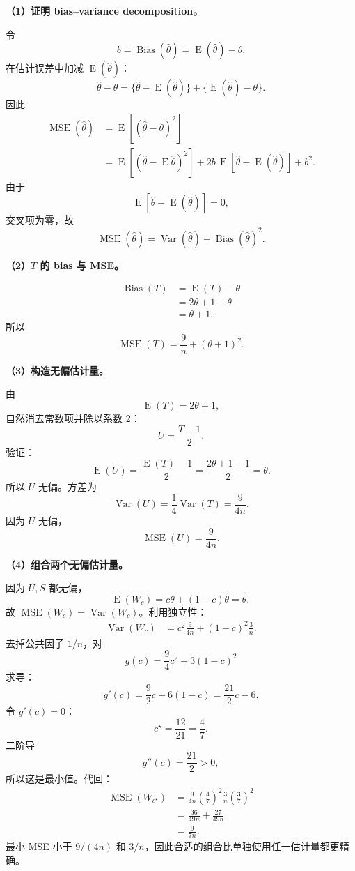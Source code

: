 \documentclass[11pt,a4paper]{article}
\newcommand{\E}{\operatorname{E}}
\newcommand{\Var}{\operatorname{Var}}
\newcommand{\Bias}{\operatorname{Bias}}
\newcommand{\MSE}{\operatorname{MSE}}
\begin{document}
\begin{solutionbox}
\textbf{（1）证明 bias--variance decomposition。}

令
\[
  b=\Bias(\hat\theta)=\E(\hat\theta)-\theta.
\]
在估计误差中加减 $\E(\hat\theta)$：
\[
  \hat\theta-\theta
  =
  \{\hat\theta-\E(\hat\theta)\}
  +
  \{\E(\hat\theta)-\theta\}.
\]
因此
\[
\begin{aligned}
  \MSE(\hat\theta)
  &=
  \E[(\hat\theta-\theta)^2]\\
  &=
  \E[(\hat\theta-\E\hat\theta)^2]
  +2b\,\E[\hat\theta-\E(\hat\theta)]
  +b^2.
\end{aligned}
\]
由于
\[
  \E[\hat\theta-\E(\hat\theta)]=0,
\]
交叉项为零，故
\[
  \boxed{
  \MSE(\hat\theta)
  =
  \Var(\hat\theta)+\Bias(\hat\theta)^2.
  }
\]

\textbf{（2）$T$ 的 bias 与 MSE。}

\[
\begin{aligned}
  \Bias(T)
  &=
  \E(T)-\theta\\
  &=
  2\theta+1-\theta\\
  &=
  \boxed{\theta+1}.
\end{aligned}
\]
所以
\[
  \boxed{
  \MSE(T)
  =
  \frac9n+(\theta+1)^2.
  }
\]

\textbf{（3）构造无偏估计量。}

由
\[
  \E(T)=2\theta+1,
\]
自然消去常数项并除以系数 2：
\[
  \boxed{U=\frac{T-1}{2}}.
\]
验证：
\[
  \E(U)
  =
  \frac{\E(T)-1}{2}
  =
  \frac{2\theta+1-1}{2}
  =
  \theta.
\]
所以 $U$ 无偏。方差为
\[
  \Var(U)
  =
  \frac14\Var(T)
  =
  \boxed{\frac9{4n}}.
\]
因为 $U$ 无偏，
\[
  \boxed{\MSE(U)=\frac9{4n}}.
\]

\textbf{（4）组合两个无偏估计量。}

因为 $U,S$ 都无偏，
\[
  \E(W_c)=c\theta+(1-c)\theta=\theta,
\]
故 $\MSE(W_c)=\Var(W_c)$。利用独立性：
\[
\begin{aligned}
  \Var(W_c)
  &=
  c^2\frac9{4n}
  +(1-c)^2\frac3n.
\end{aligned}
\]
去掉公共因子 $1/n$，对
\[
  g(c)=\frac94c^2+3(1-c)^2
\]
求导：
\[
  g'(c)=\frac92c-6(1-c)=\frac{21}{2}c-6.
\]
令 $g'(c)=0$：
\[
  \boxed{c^\star=\frac{12}{21}=\frac47}.
\]
二阶导
\[
  g''(c)=\frac{21}{2}>0,
\]
所以这是最小值。代回：
\[
\begin{aligned}
  \MSE(W_{c^\star})
  &=
  \frac9{4n}\left(\frac47\right)^2
  \frac3n\left(\frac37\right)^2\\
  &=
  \frac{36}{49n}+\frac{27}{49n}\\
  &=
  \boxed{\frac9{7n}}.
\end{aligned}
\]
最小 MSE 小于 $9/(4n)$ 和 $3/n$，因此合适的组合比单独使用任一估计量都更精确。
\end{solutionbox}
\end{document}
